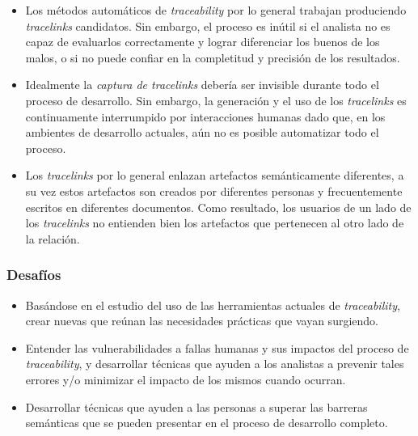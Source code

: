 \documentclass[a4paper,12pt,twoside,spanish,openright]{book}
\begin{document}
\begin{itemize}[label={$\times$}]

\item Los métodos automáticos de \textit{traceability} por lo general trabajan produciendo \textit{tracelinks} candidatos. Sin embargo, el proceso es inútil si el analista no es capaz de evaluarlos correctamente y lograr diferenciar los buenos de los malos, o si no puede confiar en la completitud y precisión de los resultados.

\item Idealmente la \textit{captura de tracelinks} debería ser invisible durante todo el proceso de desarrollo. Sin embargo, la generación y el uso de los \textit{tracelinks} es continuamente interrumpido por interacciones humanas dado que, en los ambientes de desarrollo actuales, aún no es posible automatizar todo el proceso.

\item Los \textit{tracelinks} por lo general enlazan artefactos semánticamente diferentes, a su vez estos artefactos son creados por diferentes personas y frecuentemente escritos en diferentes documentos. Como resultado, los usuarios de un lado de los \textit{tracelinks} no entienden bien los artefactos que pertenecen al otro lado de la relación.

\end{itemize}

\subsubsection{Desafíos}

\begin{itemize}[label={\checkmark}]

\item Basándose en el estudio del uso de las herramientas actuales de \textit{traceability}, crear nuevas que reúnan las necesidades prácticas que vayan surgiendo.

\item Entender las vulnerabilidades a fallas humanas y sus impactos del proceso de \textit{traceability}, y desarrollar técnicas que ayuden a los analistas a prevenir tales errores y/o minimizar el impacto de los mismos cuando ocurran.

\item Desarrollar técnicas que ayuden a las personas a superar las barreras semánticas que se pueden presentar en el proceso de desarrollo completo.

\end{itemize}
\end{document}
